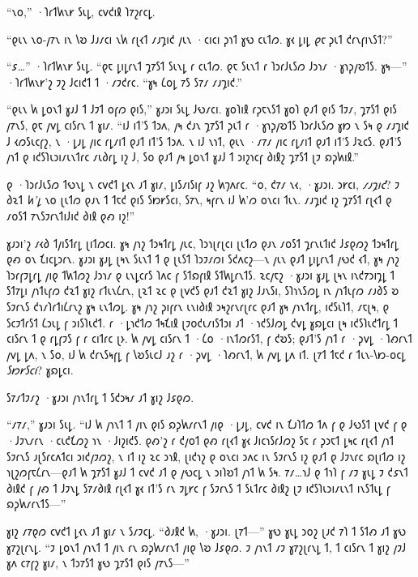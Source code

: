 “𐑯𐑴,” ·𐑐𐑩𐑑𐑿𐑯𐑾 𐑕𐑧𐑛, 𐑤𐑫𐑒𐑦𐑙 𐑐𐑳𐑟𐑩𐑤𐑛.

“𐑞𐑧𐑯 𐑯𐑴-𐑢𐑳𐑯 𐑦𐑯 𐑘𐑹 𐑓𐑨𐑥𐑤𐑦 𐑯𐑿 𐑩𐑚𐑬𐑑 𐑥𐑨𐑡𐑦𐑒 𐑢𐑧𐑯 ·𐑤𐑦𐑤𐑦 𐑜𐑪𐑑 𐑣𐑻 𐑤𐑧𐑑𐑼. 𐑣𐑬 𐑛𐑦𐑛 \emph{𐑞𐑱} 𐑜𐑧𐑑 𐑒𐑩𐑯𐑝𐑦𐑯𐑕𐑑?”

“𐑭…” ·𐑐𐑩𐑑𐑿𐑯𐑾 𐑕𐑧𐑛. “𐑞𐑱 𐑛𐑦𐑛𐑩𐑯𐑑 𐑡𐑳𐑕𐑑 𐑕𐑧𐑯𐑛 𐑩 𐑤𐑧𐑑𐑼. 𐑞𐑱 𐑕𐑧𐑯𐑑 𐑩 𐑐𐑮𐑩𐑓𐑧𐑕𐑼 𐑓𐑮𐑪𐑥 ·𐑣𐑪𐑜𐑢𐑹𐑑𐑕. 𐑣𐑰—” ·𐑐𐑩𐑑𐑿𐑯𐑾'𐑟 𐑲𐑟 𐑓𐑤𐑦𐑒𐑑 𐑑 ·𐑥𐑲𐑒𐑩𐑤. “𐑣𐑰 𐑖𐑴𐑛 𐑳𐑕 𐑕𐑳𐑥 𐑥𐑨𐑡𐑦𐑒.”

“𐑞𐑧𐑯 𐑿 𐑛𐑴𐑯𐑑 𐑣𐑨𐑓 𐑑 𐑓𐑲𐑑 𐑴𐑝𐑼 𐑞𐑦𐑕,” 𐑣𐑨𐑮𐑦 𐑕𐑧𐑛 𐑓𐑻𐑥𐑤𐑦. 𐑣𐑴𐑐𐑦𐑙 𐑩𐑜𐑱𐑯𐑕𐑑 𐑣𐑴𐑐 𐑞𐑨𐑑 𐑞𐑦𐑕 𐑑𐑲𐑥, 𐑡𐑳𐑕𐑑 𐑞𐑦𐑕 𐑢𐑳𐑯𐑕, 𐑞𐑱 𐑢𐑫𐑛 𐑤𐑦𐑕𐑩𐑯 𐑑 𐑣𐑦𐑥. “𐑦𐑓 𐑦𐑑'𐑕 𐑑𐑮𐑵, 𐑢𐑰 𐑒𐑨𐑯 𐑡𐑳𐑕𐑑 𐑜𐑧𐑑 𐑩 ·𐑣𐑪𐑜𐑢𐑹𐑑𐑕 𐑐𐑮𐑩𐑓𐑧𐑕𐑼 𐑣𐑽 𐑯 𐑕𐑰 𐑞 𐑥𐑨𐑡𐑦𐑒 𐑓 𐑬𐑼𐑕𐑧𐑤𐑝𐑟, 𐑯 ·𐑛𐑨𐑛 𐑢𐑦𐑤 𐑩𐑛𐑥𐑦𐑑 𐑞𐑨𐑑 𐑦𐑑'𐑕 𐑑𐑮𐑵. 𐑯 𐑦𐑓 𐑯𐑪𐑑, 𐑞𐑧𐑯 ·𐑥𐑳𐑥 𐑢𐑦𐑤 𐑩𐑛𐑥𐑦𐑑 𐑞𐑨𐑑 𐑦𐑑'𐑕 𐑓𐑷𐑤𐑕. 𐑞𐑨𐑑'𐑕 𐑢𐑪𐑑 𐑞 𐑦𐑒𐑕𐑐𐑧𐑮𐑦𐑥𐑧𐑯𐑑𐑩𐑤 𐑥𐑧𐑔𐑩𐑛 𐑦𐑟 𐑓, 𐑕𐑴 𐑞𐑨𐑑 𐑢𐑰 𐑛𐑴𐑯𐑑 𐑣𐑨𐑓 𐑑 𐑮𐑦𐑟𐑪𐑤𐑝 𐑔𐑦𐑙𐑟 𐑡𐑳𐑕𐑑 𐑚𐑲 𐑸𐑜𐑿𐑦𐑙.”

𐑞 ·𐑐𐑮𐑩𐑓𐑧𐑕𐑼 𐑑𐑻𐑯𐑛 𐑯 𐑤𐑫𐑒𐑑 𐑛𐑬𐑯 𐑨𐑑 𐑣𐑦𐑥, 𐑛𐑦𐑕𐑥𐑦𐑕𐑦𐑝 𐑨𐑟 𐑿𐑠𐑵𐑩𐑤. “𐑴, 𐑒𐑳𐑥 𐑯𐑬, ·𐑣𐑨𐑮𐑦. 𐑮𐑾𐑤𐑦, \emph{𐑥𐑨𐑡𐑦𐑒}? 𐑲 𐑔𐑷𐑑 \emph{𐑿'𐑛} 𐑯𐑴 𐑚𐑧𐑑𐑼 𐑞𐑨𐑯 𐑑 𐑑𐑱𐑒 𐑞𐑦𐑕 𐑕𐑽𐑾𐑕𐑤𐑦, 𐑕𐑳𐑯, 𐑰𐑝𐑩𐑯 𐑦𐑓 𐑿'𐑼 𐑴𐑯𐑤𐑦 𐑑𐑧𐑯. 𐑥𐑨𐑡𐑦𐑒 𐑦𐑟 𐑡𐑳𐑕𐑑 𐑩𐑚𐑬𐑑 𐑞 𐑥𐑴𐑕𐑑 𐑳𐑯𐑕𐑲𐑩𐑯𐑑𐑦𐑓𐑦𐑒 𐑔𐑦𐑙 𐑞𐑺 𐑦𐑟!”

𐑣𐑨𐑮𐑦'𐑟 𐑥𐑬𐑔 𐑑𐑢𐑦𐑕𐑑𐑩𐑛 𐑚𐑦𐑑𐑼𐑤𐑦. 𐑣𐑰 𐑢𐑪𐑟 𐑑𐑮𐑰𐑑𐑩𐑛 𐑢𐑧𐑤, 𐑐𐑮𐑪𐑚𐑩𐑚𐑤𐑦 𐑚𐑧𐑑𐑼 𐑞𐑨𐑯 𐑥𐑴𐑕𐑑 𐑡𐑩𐑯𐑧𐑑𐑦𐑒 𐑓𐑭𐑞𐑼𐑟 𐑑𐑮𐑰𐑑𐑩𐑛 𐑞𐑺 𐑴𐑯 𐑗𐑦𐑤𐑛𐑮𐑩𐑯. 𐑣𐑨𐑮𐑦 𐑣𐑨𐑛 𐑚𐑰𐑯 𐑕𐑧𐑯𐑑 𐑑 𐑞 𐑚𐑧𐑕𐑑 𐑐𐑮𐑲𐑥𐑼𐑦 𐑕𐑒𐑵𐑤𐑟—𐑯 𐑢𐑧𐑯 𐑞𐑨𐑑 𐑛𐑦𐑛𐑩𐑯𐑑 𐑢𐑻𐑒 𐑬𐑑, 𐑣𐑰 𐑢𐑪𐑟 𐑐𐑮𐑩𐑝𐑲𐑛𐑩𐑛 𐑢𐑦𐑞 𐑑𐑿𐑑𐑼𐑟 𐑓𐑮𐑪𐑥 𐑞 𐑧𐑯𐑛𐑤𐑩𐑕 𐑐𐑵𐑤 𐑝 𐑕𐑑𐑸𐑝𐑦𐑙 𐑕𐑑𐑿𐑛𐑩𐑯𐑑𐑕. 𐑷𐑤𐑢𐑱𐑟 ·𐑣𐑨𐑮𐑦 𐑣𐑨𐑛 𐑚𐑰𐑯 𐑦𐑯𐑒𐑳𐑮𐑦𐑡𐑛 𐑑 𐑕𐑑𐑳𐑛𐑦 𐑢𐑪𐑑𐑧𐑝𐑼 𐑒𐑷𐑑 𐑣𐑦𐑟 𐑩𐑑𐑧𐑯𐑖𐑩𐑯, 𐑚𐑷𐑑 𐑷𐑤 𐑞 𐑚𐑫𐑒𐑕 𐑞𐑨𐑑 𐑒𐑷𐑑 𐑣𐑦𐑟 𐑓𐑨𐑯𐑕𐑦, 𐑕𐑐𐑪𐑯𐑕𐑼𐑛 𐑦𐑯 𐑢𐑪𐑑𐑧𐑝𐑼 𐑥𐑨𐑔𐑕 𐑹 𐑕𐑲𐑩𐑯𐑕 𐑒𐑪𐑥𐑐𐑩𐑑𐑦𐑖𐑩𐑯𐑟 𐑣𐑰 𐑧𐑯𐑑𐑼𐑛. 𐑣𐑰 𐑢𐑪𐑟 𐑜𐑦𐑝𐑩𐑯 𐑧𐑯𐑦𐑔𐑦𐑙 𐑮𐑰𐑟𐑩𐑯𐑩𐑚𐑩𐑤 𐑞𐑨𐑑 𐑣𐑰 𐑢𐑪𐑯𐑑𐑩𐑛, 𐑦𐑒𐑕𐑧𐑐𐑑, 𐑥𐑱𐑚𐑰, 𐑞 𐑕𐑤𐑲𐑑𐑩𐑕𐑑 𐑖𐑮𐑧𐑛 𐑝 𐑮𐑦𐑕𐑐𐑧𐑒𐑑. 𐑩 ·𐑛𐑪𐑒𐑑𐑼 𐑑𐑰𐑗𐑦𐑙 𐑚𐑲𐑴𐑒𐑧𐑥𐑦𐑕𐑑𐑮𐑦 𐑨𐑑 ·𐑪𐑒𐑕𐑓𐑼𐑛 𐑒𐑫𐑛 𐑣𐑸𐑛𐑤𐑦 𐑚𐑰 𐑦𐑒𐑕𐑐𐑧𐑒𐑑𐑩𐑛 𐑑 𐑤𐑦𐑕𐑩𐑯 𐑑 𐑞 𐑩𐑛𐑝𐑲𐑕 𐑝 𐑩 𐑤𐑦𐑑𐑩𐑤 𐑚𐑶. 𐑿 𐑢𐑫𐑛 𐑤𐑦𐑕𐑩𐑯 𐑑 ·𐑖𐑴 ·𐑦𐑯𐑑𐑼𐑩𐑕𐑑, 𐑝 𐑒𐑹𐑕; 𐑞𐑨𐑑'𐑕 𐑢𐑪𐑑 𐑩 ·𐑜𐑫𐑛 ·𐑐𐑺𐑩𐑯𐑑 𐑢𐑫𐑛 𐑛𐑵, 𐑯 𐑕𐑴, 𐑦𐑓 𐑿 𐑒𐑩𐑯𐑕𐑰𐑝𐑛 𐑝 𐑘𐑹𐑕𐑧𐑤𐑓 𐑨𐑟 𐑩 ·𐑜𐑫𐑛 ·𐑐𐑺𐑩𐑯𐑑, 𐑿 𐑢𐑫𐑛 𐑛𐑵 𐑦𐑑. 𐑚𐑳𐑑 𐑑𐑱𐑒 𐑩 𐑑𐑧𐑯-𐑘𐑽-𐑴𐑤𐑛 \emph{𐑕𐑽𐑾𐑕𐑤𐑦}? 𐑣𐑸𐑛𐑤𐑦.

𐑕𐑳𐑥𐑑𐑲𐑥𐑟 ·𐑣𐑨𐑮𐑦 𐑢𐑪𐑯𐑑𐑩𐑛 𐑑 𐑕𐑒𐑮𐑰𐑥 𐑨𐑑 𐑣𐑦𐑟 𐑓𐑭𐑞𐑼.

“𐑥𐑳𐑥,” 𐑣𐑨𐑮𐑦 𐑕𐑧𐑛. “𐑦𐑓 𐑿 𐑢𐑪𐑯𐑑 𐑑 𐑢𐑦𐑯 𐑞𐑦𐑕 𐑸𐑜𐑿𐑥𐑩𐑯𐑑 𐑢𐑦𐑞 ·𐑛𐑨𐑛, 𐑤𐑫𐑒 𐑦𐑯 𐑗𐑨𐑐𐑑𐑼 𐑑𐑵 𐑝 𐑞 𐑓𐑻𐑕𐑑 𐑚𐑫𐑒 𐑝 𐑞 ·𐑓𐑲𐑯𐑥𐑩𐑯 ·𐑤𐑧𐑒𐑗𐑼𐑟 𐑪𐑯 ·𐑓𐑦𐑟𐑦𐑒𐑕. 𐑞𐑺'𐑟 𐑩 𐑒𐑢𐑴𐑑 𐑞𐑺 𐑩𐑚𐑬𐑑 𐑣𐑬 𐑓𐑦𐑤𐑪𐑕𐑩𐑓𐑼𐑟 𐑕𐑱 𐑩 𐑜𐑮𐑱𐑑 𐑛𐑰𐑤 𐑩𐑚𐑬𐑑 𐑢𐑪𐑑 𐑕𐑲𐑩𐑯𐑕 𐑨𐑚𐑕𐑩𐑤𐑵𐑑𐑤𐑦 𐑮𐑦𐑒𐑢𐑲𐑼𐑟, 𐑯 𐑦𐑑 𐑦𐑟 𐑷𐑤 𐑮𐑪𐑙, 𐑚𐑦𐑒𐑪𐑟 𐑞 𐑴𐑯𐑤𐑦 𐑮𐑵𐑤 𐑦𐑯 𐑕𐑲𐑩𐑯𐑕 𐑦𐑟 𐑞𐑨𐑑 𐑞 𐑓𐑲𐑯𐑩𐑤 𐑸𐑚𐑦𐑑𐑼 𐑦𐑟 𐑪𐑚𐑟𐑼𐑝𐑱𐑖𐑩𐑯—𐑞𐑨𐑑 𐑿 𐑡𐑳𐑕𐑑 𐑣𐑨𐑓 𐑑 𐑤𐑫𐑒 𐑨𐑑 𐑞 𐑢𐑻𐑤𐑛 𐑯 𐑮𐑦𐑐𐑹𐑑 𐑢𐑪𐑑 𐑿 𐑕𐑰. 𐑳𐑥…𐑪𐑓 𐑞 𐑑𐑪𐑐 𐑝 𐑥𐑲 𐑣𐑧𐑛 𐑲 𐑒𐑭𐑯𐑑 𐑔𐑦𐑙𐑒 𐑝 𐑢𐑺 𐑑 𐑓𐑲𐑯𐑛 𐑕𐑳𐑥𐑔𐑦𐑙 𐑩𐑚𐑬𐑑 𐑣𐑬 𐑦𐑑'𐑕 𐑩𐑯 𐑲𐑛𐑾𐑤 𐑝 𐑕𐑲𐑩𐑯𐑕 𐑑 𐑕𐑧𐑑𐑩𐑤 𐑔𐑦𐑙𐑟 𐑚𐑲 𐑦𐑒𐑕𐑐𐑧𐑮𐑦𐑥𐑧𐑯𐑑 𐑦𐑯𐑕𐑑𐑧𐑛 𐑝 𐑸𐑜𐑿𐑥𐑩𐑯𐑑𐑕—”

𐑣𐑦𐑟 𐑥𐑳𐑞𐑼 𐑤𐑫𐑒𐑑 𐑛𐑬𐑯 𐑨𐑑 𐑣𐑦𐑥 𐑯 𐑕𐑥𐑲𐑤𐑛. “𐑔𐑨𐑙𐑒 𐑿, ·𐑣𐑨𐑮𐑦. 𐑚𐑳𐑑—” 𐑣𐑻 𐑣𐑧𐑛 𐑮𐑴𐑟 𐑚𐑨𐑒 𐑳𐑐 𐑑 𐑕𐑑𐑺 𐑨𐑑 𐑣𐑻 𐑣𐑳𐑟𐑚𐑩𐑯𐑛. “𐑲 𐑛𐑴𐑯𐑑 𐑢𐑪𐑯𐑑 𐑑 𐑢𐑦𐑯 𐑩𐑯 𐑸𐑜𐑿𐑥𐑩𐑯𐑑 𐑢𐑦𐑞 𐑘𐑹 𐑓𐑭𐑞𐑼. 𐑲 𐑢𐑪𐑯𐑑 𐑥𐑲 𐑣𐑳𐑟𐑚𐑩𐑯𐑛 𐑑, 𐑑 𐑤𐑦𐑕𐑩𐑯 𐑑 𐑣𐑦𐑟 𐑢𐑲𐑓 𐑣𐑵 𐑤𐑳𐑝𐑟 𐑣𐑦𐑥, 𐑯 𐑑𐑮𐑳𐑕𐑑 𐑣𐑻 𐑡𐑳𐑕𐑑 𐑞𐑦𐑕 𐑢𐑳𐑯𐑕—”


